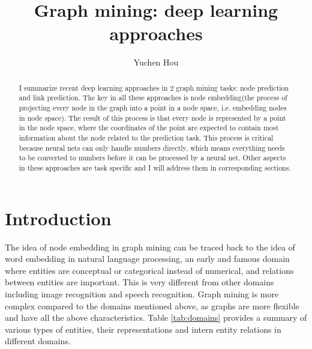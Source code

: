 \documentclass{article}
\begin{document}
\lstset{language=python, tabsize=4}
\title{Graph mining: deep learning approaches}
\author{Yuchen Hou}
\maketitle

\begin{abstract}
	I summarize recent deep learning approaches in 2 graph mining tasks: node prediction and link prediction. The key in all these approaches is node embedding(the process of projecting every node in the graph into a point in a node space, i.e. embedding nodes in node space). The result of this process is that every node is represented by a point in the node space, where the coordinates of the point are expected to contain most information about the node related to the prediction task. This process is critical because neural nets can only handle numbers directly, which means everything needs to be converted to numbers before it can be processed by a neural net. Other aspects in these approaches are task specific and I will address them in corresponding sections.
\end{abstract}

\section{Introduction}

The idea of node embedding in graph mining can be traced back to the idea of word embedding in natural language processing, an early and famous domain where entities are conceptual or categorical instead of numerical, and relations between entities are important. This is very different from other domains including image recognition and speech recognition. Graph mining is more complex compared to the domains mentioned above, as graphs are more flexible and have all the above characteristics. Table \ref{tab:domains} provides a summary of various types of entities, their representations and intern entity relations in different domains.
\end{document}
